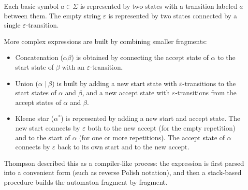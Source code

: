Each basic symbol $a \in \Sigma$ is represented by two states with a transition labeled $a$ between them. The empty string $\varepsilon$ is represented by two states connected by a single $\varepsilon$-transition.

More complex expressions are built by combining smaller fragments:
\begin{itemize}
	\item Concatenation ($\alpha\beta$) is obtained by connecting the accept state of $\alpha$ to the start state of $\beta$ with an $\varepsilon$-transition.
	\item Union ($\alpha \mid \beta$) is built by adding a new start state with $\varepsilon$-transitions to the start states of $\alpha$ and $\beta$, and a new accept state with $\varepsilon$-transitions from the accept states of $\alpha$ and $\beta$.
	\item Kleene star ($\alpha^\ast$) is represented by adding a new start and accept state. The new start connects by $\varepsilon$ both to the new accept (for the empty repetition) and to the start of $\alpha$ (for one or more repetitions). The accept state of $\alpha$ connects by $\varepsilon$ back to its own start and to the new accept.
\end{itemize}

Thompson described this as a compiler-like process: the expression is first parsed into a convenient form (such as reverse Polish notation), and then a stack-based procedure builds the automaton fragment by fragment.


